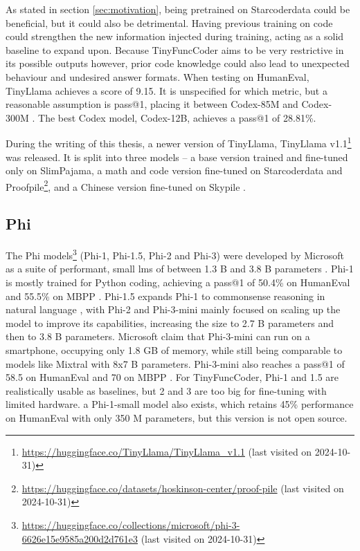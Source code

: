 As stated in section \ref{sec:motivation}, being pretrained on Starcoderdata could be beneficial, but it could also be detrimental.
Having previous training on code could strengthen the new information injected during training, acting as a solid baseline to expand upon.
Because TinyFuncCoder aims to be very restrictive in its possible outputs however, prior code knowledge could also lead to unexpected behaviour and undesired answer formats.
When testing on HumanEval, TinyLlama achieves a score of 9.15.
It is unspecified for which metric, but a reasonable assumption is pass@1, placing it between Codex-85M and Codex-300M \cite{Chen.2021}.
The best Codex model, Codex-12B, achieves a pass@1 of 28.81\%.

During the writing of this thesis, a newer version of TinyLlama, TinyLlama v1.1\footnote{\url{https://huggingface.co/TinyLlama/TinyLlama_v1.1} (last visited on 2024-10-31)} was released.
It is split into three models -- a base version trained and fine-tuned only on SlimPajama, a math and code version fine-tuned on Starcoderdata and Proofpile\footnote{\url{https://huggingface.co/datasets/hoskinson-center/proof-pile} (last visited on 2024-10-31)}, and a Chinese version fine-tuned on Skypile \cite{Wei.2023}.


\subsection{Phi}
\label{sec:phi}
The Phi models\footnote{\url{https://huggingface.co/collections/microsoft/phi-3-6626e15e9585a200d2d761e3} (last visited on 2024-10-31)} (Phi-1, Phi-1.5, Phi-2 and Phi-3) were developed by Microsoft as a suite of performant, small \acp{lm} of between 1.3 B and 3.8 B parameters \cite{Gunasekar.2023,Li.2023,MojanJavaheripi.2023,Abdin.2024}.
Phi-1 is mostly trained for Python coding, achieving a pass@1 of 50.4\% on HumanEval and 55.5\% on MBPP \cite{Gunasekar.2023}.
Phi-1.5 expands Phi-1 to commonsense reasoning in natural language \cite{Li.2023}, with Phi-2 and Phi-3-mini mainly focused on scaling up the model to improve its capabilities, increasing the size to 2.7 B parameters and then to 3.8 B parameters.
Microsoft claim that Phi-3-mini can run on a smartphone, occupying only 1.8 GB of memory, while still being comparable to models like Mixtral with 8x7 B parameters.
Phi-3-mini also reaches a pass@1 of 58.5 on HumanEval and 70 on MBPP \cite{Abdin.2024}.
For TinyFuncCoder, Phi-1 and 1.5 are realistically usable as baselines, but 2 and 3 are too big for fine-tuning with limited hardware.
a Phi-1-small model also exists, which retains 45\% performance on HumanEval with only 350 M parameters, but this version is not open source.

